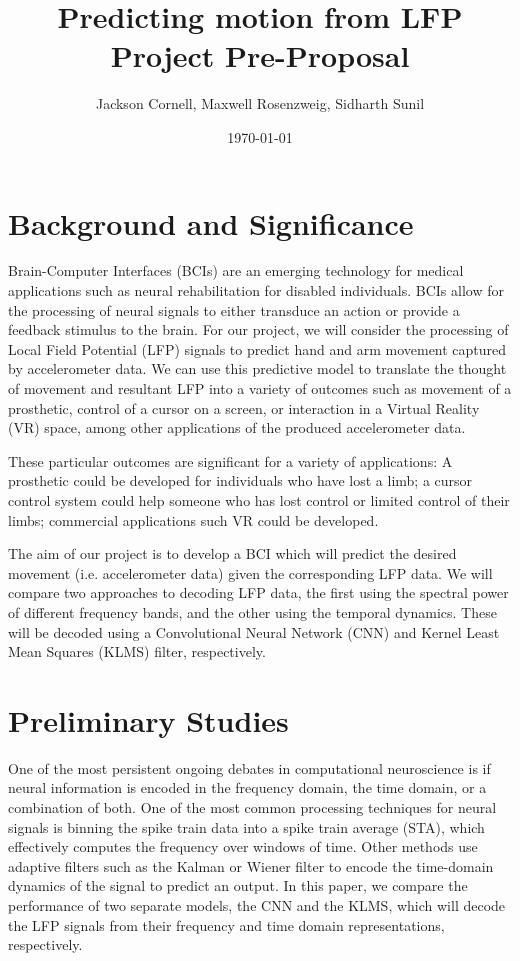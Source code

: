 \documentclass[12pt]{article}
\title{ Predicting motion from LFP Project Pre-Proposal }
\author{ Jackson Cornell, Maxwell Rosenzweig, Sidharth Sunil }
\date{\today}
\begin{document}
\maketitle

\section{Background and Significance}

Brain-Computer Interfaces (BCIs) are an emerging technology for medical applications such as neural rehabilitation for disabled individuals. BCIs allow for the processing of neural signals to either transduce an action or provide a feedback stimulus to the brain. For our project, we will consider the processing of Local Field Potential (LFP) signals to predict hand and arm movement captured by accelerometer data. We can use this predictive model to translate the thought of movement and resultant LFP into a variety of outcomes such as movement of a prosthetic, control of a cursor on a screen, or interaction in a Virtual Reality (VR) space, among other applications of the produced accelerometer data.

These particular outcomes are significant for a variety of applications: A prosthetic could be developed for individuals who have lost a limb; a cursor control system could help someone who has lost control or limited control of their limbs; commercial applications such VR could be developed.

The aim of our project is to develop a BCI which will predict the desired movement (i.e. accelerometer data) given the corresponding LFP data. We will compare two approaches to decoding LFP data, the first using the spectral power of different frequency bands, and the other using the temporal dynamics. These will be decoded using a Convolutional Neural Network (CNN) and Kernel Least Mean Squares (KLMS) filter, respectively.

\section{Preliminary Studies}

One of the most persistent ongoing debates in computational neuroscience is if neural information is encoded in the frequency domain, the time domain, or a combination of both. One of the most common processing techniques for neural signals is binning the spike train data into a spike train average (STA), which effectively computes the frequency over windows of time. Other methods use adaptive filters such as the Kalman or Wiener filter to encode the time-domain dynamics of the signal to predict an output. In this paper, we compare the performance of two separate models, the CNN and the KLMS, which will decode the LFP signals from their frequency and time domain representations, respectively.
\end{document}
